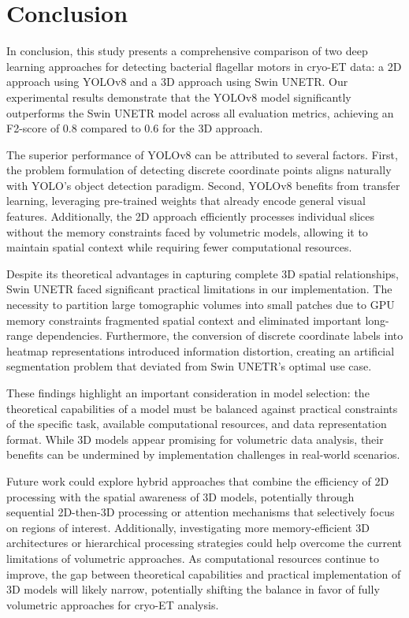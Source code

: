 \documentclass{article}
\begin{document}
\section{Conclusion}
\label{sec:conc}

In conclusion, this study presents a comprehensive comparison of two deep learning approaches for detecting bacterial flagellar motors in cryo-ET data: a 2D approach using YOLOv8 and a 3D approach using Swin UNETR. Our experimental results demonstrate that the YOLOv8 model significantly outperforms the Swin UNETR model across all evaluation metrics, achieving an F2-score of 0.8 compared to 0.6 for the 3D approach.

The superior performance of YOLOv8 can be attributed to several factors. First, the problem formulation of detecting discrete coordinate points aligns naturally with YOLO's object detection paradigm. Second, YOLOv8 benefits from transfer learning, leveraging pre-trained weights that already encode general visual features. Additionally, the 2D approach efficiently processes individual slices without the memory constraints faced by volumetric models, allowing it to maintain spatial context while requiring fewer computational resources.

Despite its theoretical advantages in capturing complete 3D spatial relationships, Swin UNETR faced significant practical limitations in our implementation. The necessity to partition large tomographic volumes into small patches due to GPU memory constraints fragmented spatial context and eliminated important long-range dependencies. Furthermore, the conversion of discrete coordinate labels into heatmap representations introduced information distortion, creating an artificial segmentation problem that deviated from Swin UNETR's optimal use case.

These findings highlight an important consideration in model selection: the theoretical capabilities of a model must be balanced against practical constraints of the specific task, available computational resources, and data representation format. While 3D models appear promising for volumetric data analysis, their benefits can be undermined by implementation challenges in real-world scenarios.

Future work could explore hybrid approaches that combine the efficiency of 2D processing with the spatial awareness of 3D models, potentially through sequential 2D-then-3D processing or attention mechanisms that selectively focus on regions of interest. Additionally, investigating more memory-efficient 3D architectures or hierarchical processing strategies could help overcome the current limitations of volumetric approaches. As computational resources continue to improve, the gap between theoretical capabilities and practical implementation of 3D models will likely narrow, potentially shifting the balance in favor of fully volumetric approaches for cryo-ET analysis.
\end{document}
